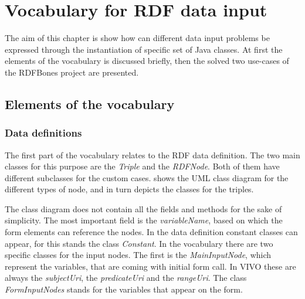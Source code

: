 \chapter{Vocabulary for RDF data input}

The aim of this chapter is show how can different data input problems be expressed through the instantiation of specific set of Java classes. At first the elements of the vocabulary is discussed briefly, then the solved two use-cases of the RDFBones project are presented.

\section{Elements of the vocabulary}

\subsection{Data definitions}

The first part of the vocabulary relates to the RDF data definition. The two main classes for this purpose are the \textit{Triple} and the \textit{RDFNode}. Both of them have different subclasses for the custom cases.  shows the UML class diagram for the different types of node, and  in turn depicts the classes for the triples.


The class diagram does not contain all the fields and methods for the sake of simplicity. The most important field is the \textit{variableName}, based on which the form elements can reference the nodes. In the data definition constant classes can appear, for this stands the class \textit{Constant}. In the vocabulary there are two specific classes for the input nodes. The first is the \textit{MainInputNode}, which represent the variables, that are coming with initial form call. In VIVO these are always the \textit{subjectUri}, the \textit{predicateUri} and the \textit{rangeUri}. The class \textit{FormInputNodes} stands for the variables that appear on the form.


